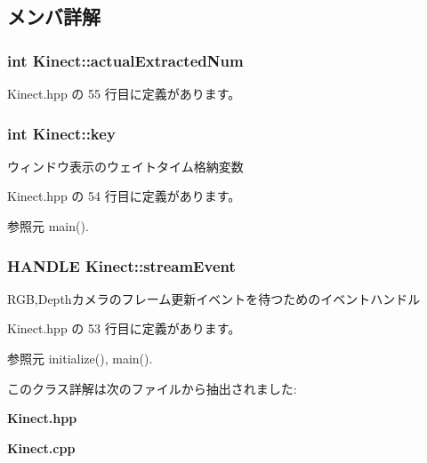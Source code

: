 \subsection{メンバ詳解}
\subsubsection[{actual\-Extracted\-Num}]{\setlength{\rightskip}{0pt plus 5cm}int Kinect\-::actual\-Extracted\-Num}\label{class_kinect_a0ca66b49a986c739058afb116f87a257}


 Kinect.\-hpp の 55 行目に定義があります。

\subsubsection[{key}]{\setlength{\rightskip}{0pt plus 5cm}int Kinect\-::key}\label{class_kinect_afe9df20df1f2538ac9ce8b61c409095a}


ウィンドウ表示のウェイトタイム格納変数 



 Kinect.\-hpp の 54 行目に定義があります。



参照元 main().

\subsubsection[{stream\-Event}]{\setlength{\rightskip}{0pt plus 5cm}H\-A\-N\-D\-L\-E Kinect\-::stream\-Event}\label{class_kinect_a975c1de77489cffc0728ae9817e127c2}


R\-G\-B,Depthカメラのフレーム更新イベントを待つためのイベントハンドル 



 Kinect.\-hpp の 53 行目に定義があります。



参照元 initialize(), main().



このクラス詳解は次のファイルから抽出されました\-:\begin{DoxyCompactItemize}
\item 
{\bf Kinect.\-hpp}\item 
{\bf Kinect.\-cpp}\end{DoxyCompactItemize}
